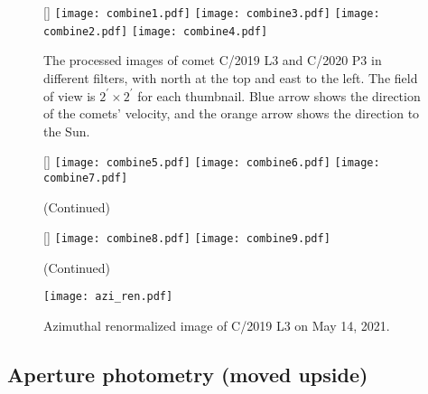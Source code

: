 \begin{figure}[!htbp]
    \centering
    [\linewidth]{
        \texttt{[image: combine1.pdf]}
        \texttt{[image: combine3.pdf]} 
        \texttt{[image: combine2.pdf]}
        \texttt{[image: combine4.pdf]}
    }
    \caption{The processed images of comet C/2019 L3 and C/2020 P3 in different filters, with north at the top and east to the left. The field of view is $ 2^{\prime} \times 2^{\prime} $ for each thumbnail. Blue arrow shows the direction of the comets' velocity, and the orange arrow shows the direction to the Sun. }
    \label{fig:combinedimg}
\end{figure}

\begin{figure}[!htbp]
    \centering
    \ContinuedFloat
    [\linewidth]{
        \texttt{[image: combine5.pdf]}
        \texttt{[image: combine6.pdf]} 
        \texttt{[image: combine7.pdf]} 
    }
        
    \caption{(Continued)}
\end{figure}

\begin{figure}[!htbp]
    \centering
    \ContinuedFloat
    [\linewidth]{
        \texttt{[image: combine8.pdf]}
        \texttt{[image: combine9.pdf]} 
    }
    
    \caption{(Continued)}
\end{figure}

\begin{figure}[!htbp]
    \centering
    \texttt{[image: azi\_ren.pdf]}
    \caption{Azimuthal renormalized image of C/2019 L3 on May 14, 2021. \label{fig:aziren}}
\end{figure}
    
\subsection{\color{red}Aperture photometry (moved upside)}



